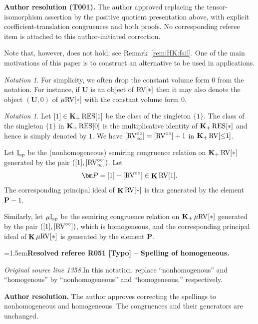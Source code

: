 \documentclass[12pt]{amsart}
\newcommand{\ResolvedRefereeRemark}[5]{%
  \par\medskip\begingroup\normalfont\small\color{gray}%
  \emergencystretch=1.5em\noindent\textbf{Resolved referee R#1 [#2] -- #3.}\par\nobreak\noindent #4\par
  \medskip\color{ResolutionGreen}\noindent\textbf{Author resolution.} #5\par
  \endgroup\medskip
}
\theoremstyle{plain}
\theoremstyle{definition}
\theoremstyle{remark}
\newtheorem{nota}[thm]{Notation}
\numberwithin{equation}{section}
\theoremstyle{plain}
\newcommand{\RV}{\textup{RV}}
\newcommand{\0}{\emptyset}
\newcommand{\mgRV}{{\mu}{\RV}}
\newcommand{\RES}{\textup{RES}}
\newcommand{\isp}{\textup{I}_{\textup{sp}}}
\newcommand{\mgisp}{\mu \isp}
\DeclareMathOperator{\gsk}{\mathbf{K}_+}
\DeclareMathOperator{\ggk}{\mathbf{K}}
\newcommand{\ccirc}{\circ \circ}
\begin{document}
{\normalfont\small\color{ResolutionGreen}
\noindent\textbf{Author resolution (T001).} The author approved replacing
 the tensor-isomorphism assertion by the positive quotient presentation
 above, with explicit coefficient-translation congruences and both proofs.
 No corresponding referee item is attached to this author-initiated correction.\par}

Note that, however, \cite[Proposition~10.10(2)]{hrushovski:kazhdan:integration:vf} does not hold; see Remark~\ref{rem:HK:fail}. One of the main motivations of this paper is to construct an alternative to be used in applications.

\begin{nota}\label{drop:0}
For simplicity, we often drop the constant volume form $0$ from the notation. For instance, if $\bm U$ is an object of $\RV[*]$ then it may also denote the  object $(\bm U, 0)$ of $\mgRV[*]$ with the constant volume form $0$.
\end{nota}

\begin{nota}
Let $[1] \in \gsk \RES[1]$ be the class of the singleton $\{1\}$. The class of the singleton $\{1\}$ in $\gsk \RES[0]$ is the multiplicative identity of $\gsk \RES[*]$ and hence is simply denoted by $1$. We have $[\RV^{\circ\circ}_\infty] = [\RV^{\circ\circ}] + 1$ in $\gsk \RV[{\leq} 1]$.

Let $\isp$ be the (nonhomogeneous) semiring congruence relation on $\gsk \RV[*]$ generated by the pair $([1], [\RV^{\circ\circ}_\infty])$. Let
\[
\bm P = [1]-[\RV^{\ccirc}]  \in \ggk \RV[1].
\]
The corresponding principal ideal of $\ggk \RV[*]$ is thus generated by the element $\bm P - 1$.


Similarly, let $\mgisp$ be the  semiring congruence relation on $\gsk \mgRV[*]$ generated by the pair $([1], [\RV^{\circ\circ}])$, which is homogeneous, and the corresponding principal ideal of $\ggk \mgRV[*]$ is generated by the element $\bm P$.
\end{nota}

\ResolvedRefereeRemark{051}{Typo}{Spelling of homogeneous}{%
\textit{Original source line 1358.}\quad In this notation, replace ``nonhomogenous'' and ``homogenous'' by ``nonhomogeneous'' and ``homogeneous,'' respectively.
}{The author approves correcting the spellings to nonhomogeneous and homogeneous. The congruences and their generators are unchanged.}
\end{document}
